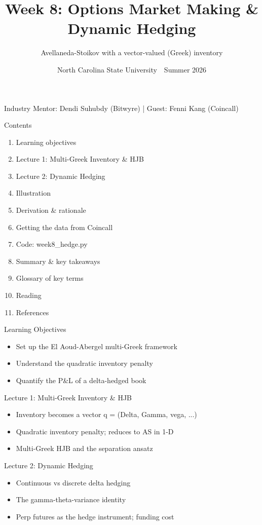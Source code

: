 \documentclass[aspectratio=169,10pt]{beamer}
\title{Week 8: Options Market Making \& Dynamic Hedging}
\subtitle{Avellaneda-Stoikov with a vector-valued (Greek) inventory}
\date{North Carolina State University \,\textbar\, Summer 2026}
\begin{document}
\begin{frame}[plain]\titlepage\begin{center}\tiny Industry Mentor: Dendi Suhubdy (Bitwyre)  |  Guest: Fenni Kang (Coincall)\end{center}\end{frame}
\begin{frame}{Contents}
\small\begin{enumerate}\setlength{\itemsep}{3pt}
  \item Learning objectives
  \item Lecture 1: Multi-Greek Inventory \& HJB
  \item Lecture 2: Dynamic Hedging
  \item Illustration
  \item Derivation \& rationale
  \item Getting the data from Coincall
  \item Code: week8\_hedge.py
  \item Summary \& key takeaways
  \item Glossary of key terms
  \item Reading
  \item References
\end{enumerate}
\end{frame}

\begin{frame}{Learning Objectives}
\begin{itemize}
  \item Set up the El Aoud-Abergel multi-Greek framework
  \item Understand the quadratic inventory penalty
  \item Quantify the P\&L of a delta-hedged book
\end{itemize}
\end{frame}

\begin{frame}{Lecture 1: Multi-Greek Inventory \& HJB}
\begin{itemize}
  \item Inventory becomes a vector q = (Delta, Gamma, vega, ...)
  \item Quadratic inventory penalty; reduces to AS in 1-D
  \item Multi-Greek HJB and the separation ansatz
\end{itemize}
\end{frame}

\begin{frame}{Lecture 2: Dynamic Hedging}
\begin{itemize}
  \item Continuous vs discrete delta hedging
  \item The gamma-theta-variance identity
  \item Perp futures as the hedge instrument; funding cost
\end{itemize}
\end{frame}
\end{document}
